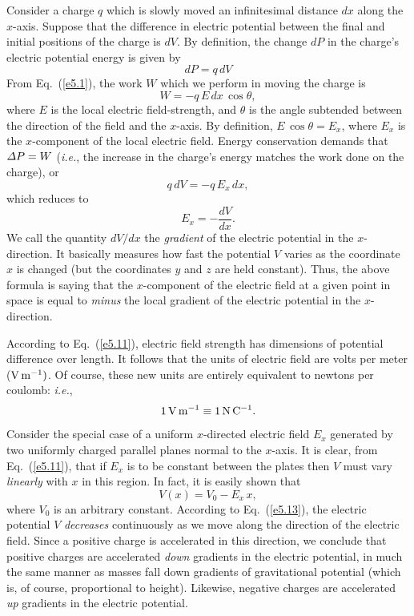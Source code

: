 Consider a charge $q$ which is slowly moved an infinitesimal  distance $dx$
along the $x$-axis. Suppose that the difference in electric potential
between the final and initial positions of the charge is $dV$.
By definition, the change $dP$ 
in the charge's electric potential energy 
is given by
\begin{equation}
dP = q \,dV
\end{equation}
From Eq.~(\ref{e5.1}), the work $W$ which we perform in moving the charge is
\begin{equation}
W = -q\,E\,dx\,\cos\theta,
\end{equation}
where $E$ is the local electric field-strength, and $\theta$ is the angle subtended
between the direction of the field and the $x$-axis. By definition,
$E\,\cos\theta=E_x$, where $E_x$ is the $x$-component of the local electric field.
Energy conservation demands that ${\mit\Delta P} = W$
({\em i.e.}, the increase in the charge's energy matches the
work done on the charge), or
\begin{equation}
q \,dV = -q\,E_x\,dx,
\end{equation}
which reduces to
\begin{equation}\label{e5.11}
E_x = - \frac{dV}{dx}.
\end{equation}
We call the quantity $dV/dx$ the {\em gradient}\/ of the
electric potential in the $x$-direction. It basically measures how fast
the potential $V$ varies as the coordinate $x$ is changed (but the
coordinates $y$ and $z$ are held constant). Thus, the above formula is saying
that the $x$-component of the electric field at a given point in space is equal
to {\em minus}\/ the local gradient of the electric potential in the
$x$-direction.  

According to Eq.~(\ref{e5.11}), electric field strength has dimensions
 of potential difference
over length. It follows that the units of electric field are volts
per meter (${\rm V\, m^{-1}})$. 
Of course, these new units are entirely equivalent to
newtons per coulomb: {\em i.e.},
\begin{equation}
1\,{\rm V \,m^{-1}} \equiv 1\,{\rm N\, C^{-1}}.
\end{equation}

Consider the special case of a uniform $x$-directed electric field $E_x$ 
generated by two uniformly charged parallel planes normal to the $x$-axis. It is
clear, from Eq.~(\ref{e5.11}), that if $E_x$ is to be constant between the plates
then $V$ must vary {\em linearly}\/ with $x$ in this region. In fact, it is
easily shown that
\begin{equation}\label{e5.13}
V(x) = V_0 - E_x\,x,
\end{equation}
where $V_0$ is an arbitrary constant. According to Eq.~(\ref{e5.13}), the electric potential $V$ {\em decreases}\/
continuously as we move
along the direction of the electric field. Since a positive charge is
accelerated in this direction, we  conclude that  positive charges are
accelerated {\em down} gradients in the electric potential, in much the same manner
as masses fall down gradients of gravitational potential (which is, of course,
proportional to height). Likewise, negative charges are accelerated {\em up}
gradients in the electric potential. 

